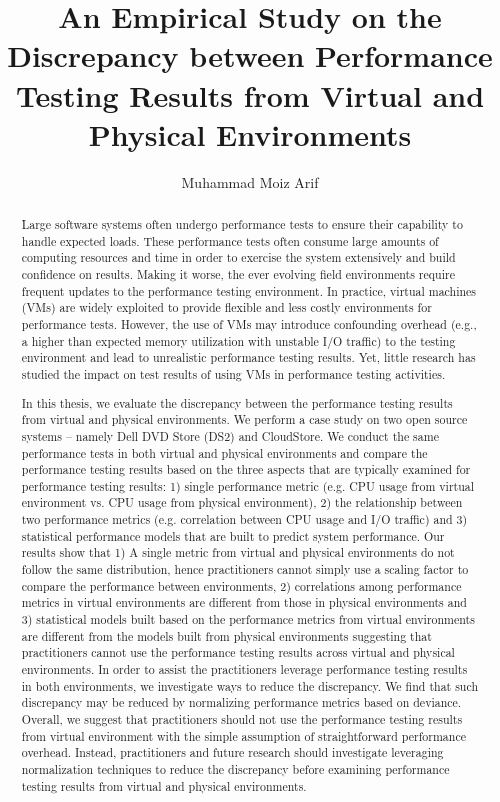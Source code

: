\documentclass[12pt]{report}
\author{Muhammad Moiz Arif}
\title {An Empirical Study on the Discrepancy between Performance Testing Results from Virtual and Physical Environments}
\begin{document}
\begin{abstract}
Large software systems often undergo performance tests to ensure their capability to handle expected loads. These performance tests often consume large amounts of computing resources and time in order to exercise the system extensively and build confidence on results. Making it worse, the ever evolving field environments require frequent updates to the performance testing environment. In practice, virtual machines (VMs) are widely exploited to provide flexible and less costly environments for performance tests. However, the use of VMs may introduce confounding overhead (e.g., a higher than expected memory utilization with unstable I/O traffic) to the testing environment and lead to unrealistic performance testing results. Yet, little research has studied the impact on test results of using VMs in performance testing activities. 

In this thesis, we evaluate the discrepancy between the performance testing results from virtual and physical environments. We perform a case study on two open source systems -- namely Dell DVD Store (DS2) and CloudStore. We conduct the same performance tests in both virtual and physical environments and compare the performance testing results based on the three aspects that are typically examined for performance testing results: 1) single performance metric (e.g. CPU usage from virtual environment vs. CPU usage from physical environment), 2) the relationship between two performance metrics (e.g. correlation between CPU usage and I/O traffic) and 3) statistical performance models that are built to predict system performance. Our results show that 1) A single metric from virtual and physical environments do not follow the same distribution, hence practitioners cannot simply use a scaling factor to compare the performance between environments,  2) correlations among performance metrics in virtual environments are different from those in physical environments and 3) statistical models built based on the performance metrics from virtual environments are different from the models built from physical environments suggesting that practitioners cannot use the performance testing results across virtual and physical environments. In order to assist the practitioners leverage performance testing results in both environments, we investigate ways to reduce the discrepancy. We find that such discrepancy may be reduced by normalizing performance metrics based on deviance. Overall, we suggest that practitioners should not use the performance testing results from virtual environment with the simple assumption of straightforward performance overhead. Instead, practitioners and future research should investigate leveraging normalization techniques to reduce the discrepancy before examining performance testing results from virtual and physical environments.


\end{abstract}
\end{document}
